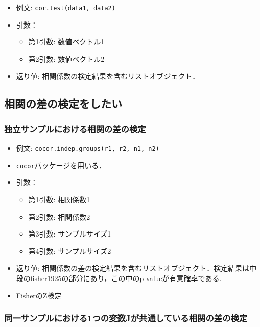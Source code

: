 \documentclass[
  xelatex, ja=standard]{bxjsarticle}
\providecommand{\tightlist}{%
  \setlength{\itemsep}{0pt}\setlength{\parskip}{0pt}}
\begin{document}
\begin{itemize}
\tightlist
\item
  例文: \texttt{cor.test(data1,\ data2)}
\item
  引数：

  \begin{itemize}
  \tightlist
  \item
    第1引数: 数値ベクトル1
  \item
    第2引数: 数値ベクトル2
  \end{itemize}
\item
  返り値: 相関係数の検定結果を含むリストオブジェクト．
\end{itemize}

\subsection{相関の差の検定をしたい}\label{ux76f8ux95a2ux306eux5deeux306eux691cux5b9aux3092ux3057ux305fux3044}

\subsubsection{独立サンプルにおける相関の差の検定}\label{ux72ecux7acbux30b5ux30f3ux30d7ux30ebux306bux304aux3051ux308bux76f8ux95a2ux306eux5deeux306eux691cux5b9a}

\begin{itemize}
\tightlist
\item
  例文: \texttt{cocor.indep.groups(r1,\ r2,\ n1,\ n2)}
\item
  \texttt{cocor}パッケージを用いる．
\item
  引数：

  \begin{itemize}
  \tightlist
  \item
    第1引数: 相関係数1
  \item
    第2引数: 相関係数2
  \item
    第3引数: サンプルサイズ1
  \item
    第4引数: サンプルサイズ2
  \end{itemize}
\item
  返り値:
  相関係数の差の検定結果を含むリストオブジェクト．検定結果は中段のfisher1925の部分にあり，この中のp-valueが有意確率である.
\item
  FisherのZ検定
\end{itemize}

\subsubsection{同一サンプルにおける1つの変数Jが共通している相関の差の検定}\label{ux540cux4e00ux30b5ux30f3ux30d7ux30ebux306bux304aux3051ux308b1ux3064ux306eux5909ux6570jux304cux5171ux901aux3057ux3066ux3044ux308bux76f8ux95a2ux306eux5deeux306eux691cux5b9a}
\end{document}
